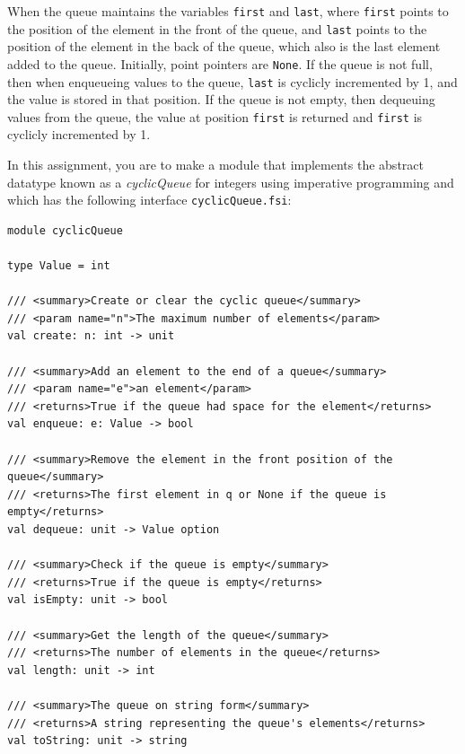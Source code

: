 When the queue maintains the variables \lstinline{first} and \lstinline{last}, where \lstinline{first} points to the position of the element in the front of the queue, and \lstinline{last} points to the position of the element in the back of the queue, which also is the last element added to the queue. Initially, point pointers are \lstinline{None}. If the queue is not full, then when enqueueing values to the queue, \lstinline{last} is cyclicly incremented by 1, and the value is stored in that position. If the queue is not empty, then dequeuing values from the queue, the value at position \lstinline{first} is returned and \lstinline{first} is cyclicly incremented by 1.

In this assignment, you are to make a module that implements the abstract datatype known as a \emph{cyclicQueue} for integers using imperative programming and which has the following interface \lstinline[language=console]{cyclicQueue.fsi}:
\begin{lstlisting}
module cyclicQueue

type Value = int

/// <summary>Create or clear the cyclic queue</summary>
/// <param name="n">The maximum number of elements</param>
val create: n: int -> unit

/// <summary>Add an element to the end of a queue</summary>
/// <param name="e">an element</param>
/// <returns>True if the queue had space for the element</returns>
val enqueue: e: Value -> bool

/// <summary>Remove the element in the front position of the queue</summary>
/// <returns>The first element in q or None if the queue is empty</returns>
val dequeue: unit -> Value option

/// <summary>Check if the queue is empty</summary>
/// <returns>True if the queue is empty</returns>
val isEmpty: unit -> bool

/// <summary>Get the length of the queue</summary>
/// <returns>The number of elements in the queue</returns>
val length: unit -> int

/// <summary>The queue on string form</summary>
/// <returns>A string representing the queue's elements</returns>
val toString: unit -> string
\end{lstlisting}
